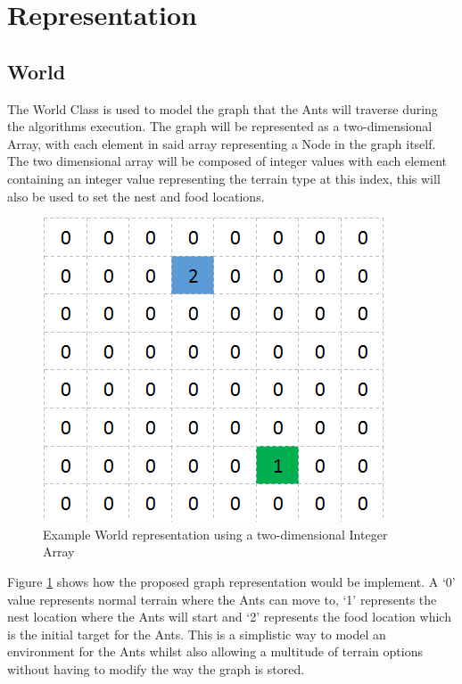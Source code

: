 \section{Representation}
\subsection{World}
\label{sec:world}
The World Class is used to model the graph that the Ants will traverse during the algorithms execution. The graph will be represented as a two-dimensional Array, with each element in said array representing a Node in the graph itself. The two dimensional array will be composed of integer values with each element containing an integer value representing the terrain type at this index, this will also be used to set the nest and food locations. 

\begin{figure}[H]
\centering
\includegraphics[scale=0.8]{Images/design/graph}
\caption{Example World representation using a two-dimensional Integer Array}
\label{fig:graph}
\end{figure}

\noindent
Figure \ref{fig:graph} shows how the proposed graph representation would be implement. A `0' value represents normal terrain where the Ants can move to, `1' represents the nest location where the Ants will start and `2' represents the food location which is the initial target for the Ants. This is a simplistic way to model an environment for the Ants whilst also allowing a multitude of terrain options without having to modify the way the graph is stored.

